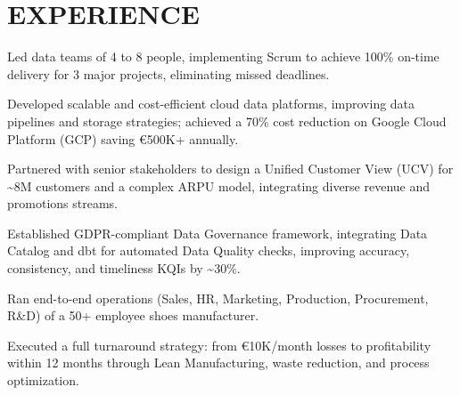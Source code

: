 \documentclass[]{deedy-resume-cv}
\begin{document}
\begin{minipage}[t]{0.60\textwidth}


\section{EXPERIENCE}

\vspace{\topsep} %
\begin{tightemize}
\item Led data teams of 4 to 8 people, implementing Scrum to achieve 100\% on-time delivery for 3 major projects, eliminating missed deadlines.

\item Developed scalable and cost-efficient cloud data platforms, improving data pipelines and storage strategies; achieved a 70\% cost reduction on Google Cloud Platform (GCP) saving €500K+ annually.

\item Partnered with senior stakeholders to design a Unified Customer View (UCV) for \~{}8M customers and a complex ARPU model, integrating diverse revenue and promotions streams.

\item Established GDPR-compliant Data Governance framework, integrating Data Catalog and dbt for automated Data Quality checks, improving accuracy, consistency, and timeliness KQIs by \~{}30\%.
\end{tightemize}

\sectionsep
{}
\begin{tightemize}
\item Ran end-to-end operations (Sales, HR, Marketing, Production, Procurement, R\&D) of a 50+ employee shoes manufacturer.

\item Executed a full turnaround strategy: from €10K/month losses to profitability within 12 months through Lean Manufacturing, waste reduction, and process optimization.
\end{tightemize}


\end{minipage}
\end{document}
